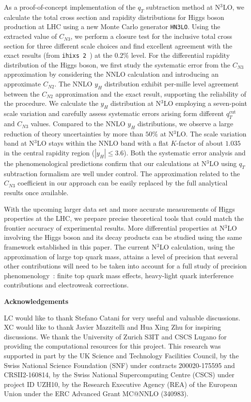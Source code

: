 \documentclass[12pt]{article}
\DeclareRobustCommand{\qt}{q_T}
\DeclareRobustCommand{\qtcut}{\ensuremath{q_T^\mathrm{cut}}}
\begin{document}
As a proof-of-concept implementation of the $\qt$ subtraction method at N$^3$LO,  we calculate the total cross section and rapidity distributions for Higgs boson production at LHC using a new Monte Carlo generator \texttt{HN3LO}. Using the extracted value of $C_{N3}$, we perform a closure test for the inclusive total cross section for three different scale choices and find excellent agreement with the exact results (from \texttt{ihixs 2}~\cite{Dulat:2018rbf}) at the $0.2\%$ level. For the differential rapidity distribution of the Higgs boson, we first study the systematic error from the $C_{N3}$ approximation by considering the NNLO calculation and introducing an approximate $C_{N2}$. The NNLO $y_H$ distribution exhibit per-mille level agreement between the $C_{N2}$ approximation and the exact result, supporting the reliability of the procedure. 
We calculate the $y_H$ distribution at N$^3$LO employing a seven-point scale variation and carefully assess systematic errors arising form different $\qtcut$ and $C_{N3}$ values. Compared to the NNLO $y_H$ distributions, we observe a large reduction of theory uncertainties by more than $50\%$ at N$^3$LO. The scale variation band at N$^3$LO stays within the NNLO band with a flat $K$-factor of about $1.035$ in the central rapidity region ($|y_H|\leq3.6$). Both the systematic error analysis and the phenomenological predictions confirm that our calculations at N$^3$LO using $\qt$ subtraction formalism are well under control. The approximation related to the $C_{N3}$ coefficient in our approach can be easily replaced by the full analytical results once available. 

With the upcoming larger data set and more accurate measurements of Higgs properties at the LHC, we prepare precise theoretical tools that could match the frontier accuracy of experimental results. More differential properties at N$^3$LO involving the Higgs boson and its decay products can be studied using the same framework established in this paper. The current N$^3$LO calculation, using the approximation of large top quark mass, attains a level of  precision that several 
other contributions will need to be taken into account for a full study of precision phenomenology~\cite{Anastasiou:2016cez}: finite top quark mass effects, heavy-light quark interference contributions  
and electroweak corrections. 


\bigskip\noindent\textbf{Acknowledgements}

LC would like to thank Stefano Catani for very useful and valuable discussions. XC would like to thank Javier Mazzitelli and Hua Xing Zhu for inspiring discussions. We thank the University of Zurich S3IT and CSCS Lugano for providing the computational resources for this project. This research was supported in part by the UK Science and Technology Facilities Council, by the Swiss National Science Foundation (SNF) under contracts 200020-175595 and CRSII2-160814, by the Swiss National Supercomputing Centre (CSCS) under project ID UZH10, by the Research Executive Agency (REA) of the European Union under the ERC Advanced Grant MC@NNLO (340983).
\end{document}
